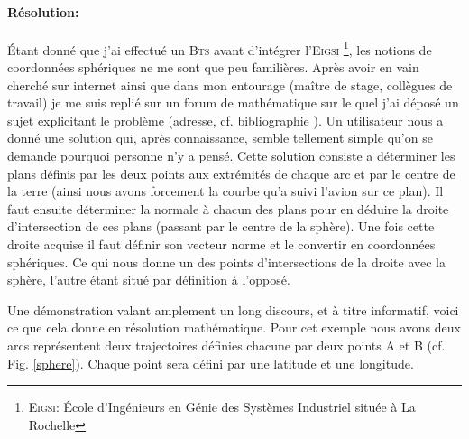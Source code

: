             \paragraph{Résolution:}
Étant donné que j'ai effectué un \textsc{Bts} avant d'intégrer l'\textsc{Eigsi} \footnote{\textsc{Eigsi}: École d'Ingénieurs en Génie des Systèmes Industriel située à La Rochelle}, les notions de coordonnées sphériques ne me sont que peu familières. Après avoir en vain cherché sur internet ainsi que dans mon entourage  (maître de stage, collègues de travail) je me suis replié sur un forum de mathématique sur le quel j'ai déposé un sujet explicitant le problème (adresse, cf. bibliographie \cite{forummath}). Un utilisateur nous a donné une solution qui, après connaissance, semble tellement simple qu'on se demande pourquoi personne n'y a pensé. Cette solution consiste a déterminer les plans définis par les deux points aux extrémités de chaque arc et par le centre de la terre (ainsi nous avons forcement la courbe qu'a suivi l'avion sur ce plan). Il faut ensuite déterminer la normale à chacun des plans pour en déduire la droite d'intersection de ces plans (passant par le centre de la sphère). Une fois cette droite acquise il faut définir son vecteur norme et le convertir en coordonnées sphériques. Ce qui nous donne un des points d'intersections de la droite avec la sphère, l'autre étant situé par définition à l'opposé.

Une démonstration valant amplement un long discours, et à titre informatif, voici ce que cela donne en résolution mathématique. Pour cet exemple nous avons deux arcs représentent deux trajectoires définies chacune par deux points A et B (cf. Fig. \vref{sphere}). Chaque point sera défini par une latitude et une longitude.

